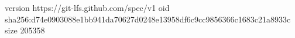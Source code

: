 version https://git-lfs.github.com/spec/v1
oid sha256:d74e0903088e1bb941da70627d0248e13958df6c9cc9856366c1683c21a8933c
size 205358
